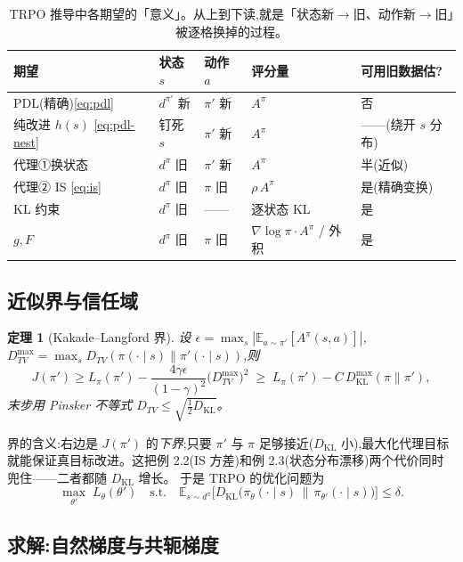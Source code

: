\documentclass[11pt]{article}
\newcommand{\E}{\mathbb{E}}
\newcommand{\KL}{D_{\mathrm{KL}}}
\newcommand{\Ap}{A^{\pi}}
\newcommand{\dpi}{d^{\pi}}
\newcommand{\dpip}{d^{\pi'}}
\newcommand{\pith}{\pi_\theta}
\theoremstyle{plain}
\newtheorem{theorem}{定理}[section]
\theoremstyle{definition}
\theoremstyle{remark}
\begin{document}
\begin{table}[h]\centering\small
\begin{tabular}{@{}lllll@{}}
\toprule
期望 & 状态 $s$ & 动作 $a$ & 评分量 & 可用旧数据估?\\
\midrule
PDL(精确)\eqref{eq:pdl} & $\dpip$ 新 & $\pi'$ 新 & $\Ap$ & 否\\
纯改进 $h(s)$ \eqref{eq:pdl-nest} & 钉死 $s$ & $\pi'$ 新 & $\Ap$ & ——(绕开 $s$ 分布)\\
代理①换状态 & $\dpi$ 旧 & $\pi'$ 新 & $\Ap$ & 半(近似)\\
代理② IS \eqref{eq:is} & $\dpi$ 旧 & $\pi$ 旧 & $\rho\,\Ap$ & 是(精确变换)\\
KL 约束 & $\dpi$ 旧 & —— & 逐状态 KL & 是\\
$g,F$ & $\dpi$ 旧 & $\pi$ 旧 & $\nabla\log\pi\cdot\Ap$ / 外积 & 是\\
\bottomrule
\end{tabular}
\caption{TRPO 推导中各期望的「意义」。从上到下读,就是「状态新$\to$旧、动作新$\to$旧」被逐格换掉的过程。}
\end{table}

\subsection{近似界与信任域}

\begin{theorem}[Kakade--Langford 界]
设 $\epsilon=\max_s|\E_{a\sim\pi'}[\Ap(s,a)]|$,$D^{\max}_{TV}=\max_s D_{TV}(\pi(\cdot\mid s)\|\pi'(\cdot\mid s))$,则
\begin{equation}\label{eq:klbound}
J(\pi')\ge L_\pi(\pi')-\frac{4\gamma\epsilon}{(1-\gamma)^2}\big(D^{\max}_{TV}\big)^2
\;\ge\; L_\pi(\pi')-C\,D^{\max}_{\mathrm{KL}}(\pi\|\pi'),
\end{equation}
末步用 Pinsker 不等式 $D_{TV}\le\sqrt{\tfrac12\KL}$。
\end{theorem}

界的含义:右边是 $J(\pi')$ 的\emph{下界};只要 $\pi'$ 与 $\pi$ 足够接近($\KL$ 小),最大化代理目标
就能保证真目标改进。这把例 2.2(IS 方差)和例 2.3(状态分布漂移)两个代价同时兜住——二者都随 $\KL$ 增长。
于是 TRPO 的优化问题为
\begin{equation}\label{eq:trpo}
\max_{\theta'}\;L_\theta(\theta')\quad\text{s.t.}\quad
\E_{s\sim\dpi}\big[\KL\big(\pith(\cdot\mid s)\,\|\,\pi_{\theta'}(\cdot\mid s)\big)\big]\le\delta.
\end{equation}

\subsection{求解:自然梯度与共轭梯度}
\end{document}

